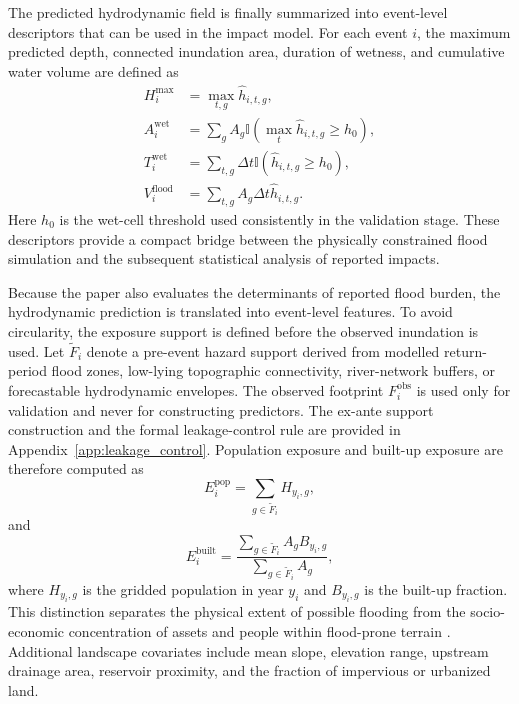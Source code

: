 \documentclass[pdflatex,sn-mathphys-ay]{sn-jnl}
\theoremstyle{thmstyleone}
\theoremstyle{thmstylethree}
\theoremstyle{thmstyletwo}
\begin{document}
The predicted hydrodynamic field is finally summarized into
event-level descriptors that can be used in the impact model.  For each
event $i$, the maximum predicted depth, connected inundation area,
duration of wetness, and cumulative water volume are defined as
\begin{align}
  H^{\max}_{i}
  &=
  \max_{t,g}
  \hat{h}_{i,t,g},
  \label{eq:padr_max_depth}
  \\
  A^{\mathrm{wet}}_{i}
  &=
  \sum_{g}
  A_g
  \mathbb{I}
  \left(
    \max_{t}\hat{h}_{i,t,g}
    \geq h_{0}
  \right),
  \label{eq:padr_wet_area}
  \\
  T^{\mathrm{wet}}_{i}
  &=
  \sum_{t,g}
  \Delta t
  \mathbb{I}
  \left(
    \hat{h}_{i,t,g}
    \geq h_{0}
  \right),
  \label{eq:padr_wet_duration}
  \\
  V^{\mathrm{flood}}_{i}
  &=
  \sum_{t,g}
  A_g
  \Delta t
  \hat{h}_{i,t,g}.
  \label{eq:padr_flood_volume}
\end{align}
Here $h_{0}$ is the wet-cell threshold used consistently in the
validation stage.  These descriptors provide a compact bridge between
the physically constrained flood simulation and the subsequent
statistical analysis of reported impacts.


Because the paper also evaluates the determinants of reported flood
burden, the hydrodynamic prediction is translated into event-level
features.  To avoid circularity, the exposure support is defined before
the observed inundation is used.  Let $\widetilde{F}_{i}$ denote a
pre-event hazard support derived from modelled return-period flood
zones, low-lying topographic connectivity, river-network buffers, or
forecastable hydrodynamic envelopes.  The observed footprint
$F^{\mathrm{obs}}_{i}$ is used only for validation and never for
constructing predictors.  The ex-ante support construction and the
formal leakage-control rule are provided in
Appendix~\ref{app:leakage_control}.  Population exposure and built-up
exposure are therefore computed as
\begin{equation}
  E^{\mathrm{pop}}_{i}
  =
  \sum_{g\in\widetilde{F}_{i}}
  H_{y_i,g},
  \label{eq:pop_exposure}
\end{equation}
and
\begin{equation}
  E^{\mathrm{built}}_{i}
  =
  \frac{
    \displaystyle
    \sum_{g\in\widetilde{F}_{i}} A_g B_{y_i,g}
  }{
    \displaystyle
    \sum_{g\in\widetilde{F}_{i}} A_g
  },
  \label{eq:built_exposure}
\end{equation}
where $H_{y_i,g}$ is the gridded population in year $y_i$ and
$B_{y_i,g}$ is the built-up fraction.  This distinction separates the
physical extent of possible flooding from the socio-economic
concentration of assets and people within flood-prone terrain
\citep{Tellman2021}.  Additional landscape covariates include mean
slope, elevation range, upstream drainage area, reservoir proximity,
and the fraction of impervious or urbanized land.
\end{document}
